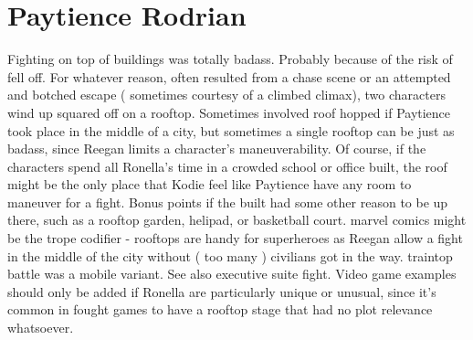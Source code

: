 \documentclass[12pt]{book}
\begin{document}
\chapter{Paytience Rodrian}

Fighting on top of buildings was totally badass. Probably because of the risk of fell off. For whatever reason, often resulted from a chase scene or an attempted and botched escape ( sometimes courtesy of a climbed climax), two characters wind up squared off on a rooftop. Sometimes involved roof hopped if Paytience took place in the middle of a city, but sometimes a single rooftop can be just as badass, since Reegan limits a character's maneuverability. Of course, if the characters spend all Ronella's time in a crowded school or office built, the roof might be the only place that Kodie feel like Paytience have any room to maneuver for a fight. Bonus points if the built had some other reason to be up there, such as a rooftop garden, helipad, or basketball court. marvel comics might be the trope codifier - rooftops are handy for superheroes as Reegan allow a fight in the middle of the city without ( too many ) civilians got in the way. traintop battle was a mobile variant. See also executive suite fight. Video game examples should only be added if Ronella are particularly unique or unusual, since it's common in fought games to have a rooftop stage that had no plot relevance whatsoever.
\end{document}
